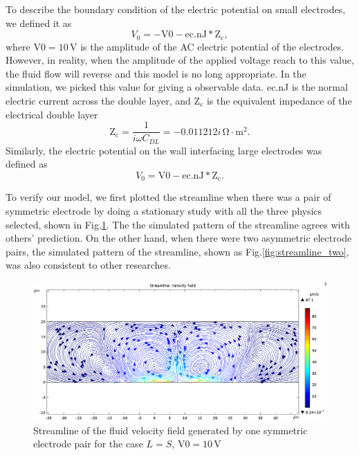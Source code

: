 \documentclass[journal,svgnames,twocolumn,x11names]{IEEEtran}
\begin{document}
To describe the boundary condition of the electric potential on small electrodes, we defined it as
\begin{equation}
    V_0=\mathrm{-V0-ec.nJ*Z_c},
\end{equation}
where $\mathrm{V0=10\,V}$ is the amplitude of the AC electric potential of the electrodes. However, in reality, when the amplitude of the applied voltage reach to this value, the fluid flow will reverse\cite{Studer2004} and this model is no long appropriate. In the simulation, we picked this value for giving a observable data. ec.nJ is the normal electric current across the double layer, and $\mathrm{Z_c}$ is the equivalent impedance of the electrical double layer
\begin{equation}
    \mathrm{Z_c}=\frac{1}{i\omega C_{DL}}=-0.011212i\,\mathrm{\Omega\cdot m^2}.
\end{equation}
Similarly, the electric potential on the wall interfacing large electrodes was defined as
\begin{equation}
    V_0=\mathrm{V0-ec.nJ*Z_c}.
\end{equation}

To verify our model, we first plotted the streamline when there was a pair of symmetric electrode by doing a stationary study with all the three physics selected, shown in Fig.\ref{fig:streamline_equal}. The the simulated pattern of the streamline agrees with others' prediction\cite{islam2006}\cite{Pham2007}. On the other hand, when there were two asymmetric electrode pairs, the simulated pattern of the streamline, shown as Fig.\ref{fig:streamline_two}, was also consistent to other researches\cite{physreveii}\cite{Gao2019}\cite{Garcia2006}.
\begin{figure}[htbp]
    \centering
    \includegraphics[scale=0.6]{streamline_equal.PNG}
    \caption{Streamline of the fluid velocity field generated by one symmetric electrode pair for the case $L = S$, $\mathrm{V0=10\,V}$}
    \label{fig:streamline_equal}
\end{figure}
\end{document}
